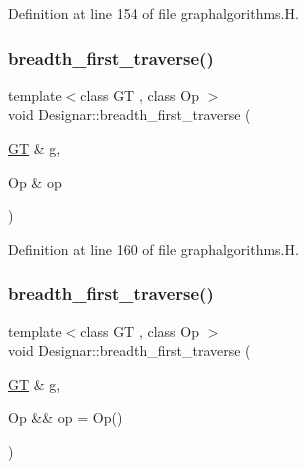 Definition at line 154 of file graphalgorithms.\+H.

\mbox{\label{namespace_designar_a0e5a24c14d4d7a9281cd79d82b8f4346}} 
\subsubsection{\texorpdfstring{breadth\+\_\+first\+\_\+traverse()}{breadth\_first\_traverse()}\hspace{0.1cm}{\footnotesize\ttfamily [3/4]}}
{\footnotesize\ttfamily template$<$class GT , class Op $>$ \\
void Designar\+::breadth\+\_\+first\+\_\+traverse (\begin{DoxyParamCaption}\item[{\hyperlink{demo-buildgraph_8_c_a3001c40d2c31ca87ed96cd7d1334a55e}{GT} \&}]{g,  }\item[{Op \&}]{op }\end{DoxyParamCaption})}



Definition at line 160 of file graphalgorithms.\+H.

\mbox{\label{namespace_designar_ad3ef274c9191673599894089bbfb354d}} 
\subsubsection{\texorpdfstring{breadth\+\_\+first\+\_\+traverse()}{breadth\_first\_traverse()}\hspace{0.1cm}{\footnotesize\ttfamily [4/4]}}
{\footnotesize\ttfamily template$<$class GT , class Op $>$ \\
void Designar\+::breadth\+\_\+first\+\_\+traverse (\begin{DoxyParamCaption}\item[{\hyperlink{demo-buildgraph_8_c_a3001c40d2c31ca87ed96cd7d1334a55e}{GT} \&}]{g,  }\item[{Op \&\&}]{op = {\ttfamily Op()} }\end{DoxyParamCaption})}



